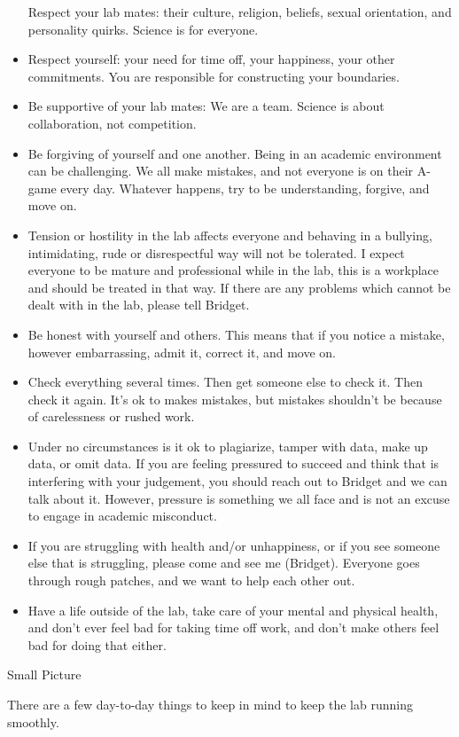 \documentclass[]{book}
\begin{document}
\begin{itemize}
  Respect your lab mates: their culture, religion, beliefs, sexual orientation, and personality quirks. Science is for everyone.
\item
  Respect yourself: your need for time off, your happiness, your other commitments. You are responsible for constructing your boundaries.
\item
  Be supportive of your lab mates: We are a team. Science is about collaboration, not competition.
\item
  Be forgiving of yourself and one another. Being in an academic environment can be challenging. We all make mistakes, and not everyone is on their A-game every day. Whatever happens, try to be understanding, forgive, and move on.
\item
  Tension or hostility in the lab affects everyone and behaving in a bullying, intimidating, rude or disrespectful way will not be tolerated. I expect everyone to be mature and professional while in the lab, this is a workplace and should be treated in that way. If there are any problems which cannot be dealt with in the lab, please tell Bridget.
\item
  Be honest with yourself and others. This means that if you notice a mistake, however embarrassing, admit it, correct it, and move on.
\item
  Check everything several times. Then get someone else to check it. Then check it again. It's ok to makes mistakes, but mistakes shouldn't be because of carelessness or rushed work.
\item
  Under no circumstances is it ok to plagiarize, tamper with data, make up data, or omit data. If you are feeling pressured to succeed and think that is interfering with your judgement, you should reach out to Bridget and we can talk about it. However, pressure is something we all face and is not an excuse to engage in academic misconduct.
\item
  If you are struggling with health and/or unhappiness, or if you see someone else that is struggling, please come and see me (Bridget). Everyone goes through rough patches, and we want to help each other out.
\item
  Have a life outside of the lab, take care of your mental and physical health, and don't ever feel bad for taking time off work, and don't make others feel bad for doing that either.
\end{itemize}

Small Picture

There are a few day-to-day things to keep in mind to keep the lab running smoothly.
\end{document}
